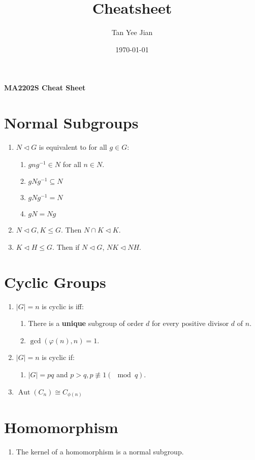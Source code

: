 \documentclass[10pt]{article}
\title{\module Cheatsheet}
\author{Tan Yee Jian}
\date{\today}
\newcommand{\ltri}{\triangleleft}
\newcommand{\module}{MA2202S }
\DeclareMathOperator{\aut}{Aut}
\begin{document}
\begin{center}
  \Large{\textbf{\module Cheat Sheet}}
\end{center}
\begin{multicols*}{3}
  \section{Normal Subgroups}
  \begin{enumerate}
    \item $N\ltri G$ is equivalent to for all $g\in G$:
      \begin{enumerate}
          \item $gng^{-1}\in N$ for all $n\in N$.
        \item $gNg^{-1}\subseteq N$
        \item $gNg^{-1}=N$
        \item $gN=Ng$
      \end{enumerate}
      \item $N\ltri G, K\leq G$. Then $N\cap K\ltri K$.
      \item $K\ltri H\leq G$. Then if $N\ltri G$, $NK\ltri NH$.
  \end{enumerate}

  \section{Cyclic Groups}
  \begin{enumerate} \item $|G|=n$ is cyclic is iff:
      \begin{enumerate}
        \item There is a \textbf{unique} subgroup of order $d$ for every
          positive divisor $d$ of $n$.
          \item $\gcd(\varphi(n),n)=1$.
      \end{enumerate}
    \item $|G|=n$ is cyclic if:
    \begin{enumerate}
      \item $|G|=pq$ and $p>q, p\not\equiv 1(\mod q)$.
    \end{enumerate}
    \item $\aut(C_{n})\cong C_{\phi(n)}$
  \end{enumerate}

  \section{Homomorphism}
  \begin{enumerate}
    \item The kernel of a homomorphism is a normal subgroup.
  \end{enumerate}


\end{multicols*}
\end{document}
